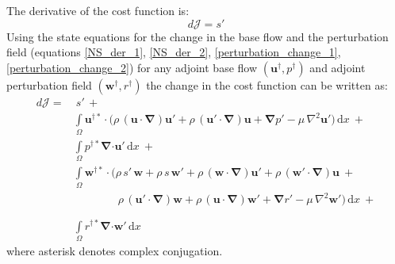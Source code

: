 \documentclass[12pt, a4paper]{article}
\begin{document}
    The derivative of the cost function is:
    \begin{equation}
        d \mathcal{J} = s'
    \end{equation}
    Using the state equations for the change in the base flow and the perturbation field (equations \ref{NS_der_1}, \ref{NS_der_2}, \ref{perturbation_change_1}, \ref{perturbation_change_2}) for any adjoint base flow $(\mathbf{u^{\dagger}},p^{\dagger})$ and adjoint perturbation field $(\mathbf{w^{\dagger}},r^{\dagger})$ the change in the cost function can be written as:
    \begin{equation}
    \begin{split}
        d \mathcal{J} =& \ s' \, + \\
        & \int\limits_{\Omega} \mathbf{u^{\dagger *} \cdot} \bigg( 
            \rho \, (\mathbf{u \cdot} \boldsymbol{\nabla}) \mathbf{u'} + 
            \rho \, (\mathbf{u' \cdot} \boldsymbol{\nabla}) \mathbf{u} + 
            \boldsymbol{\nabla} p' - 
            \mu \, \nabla^2 \mathbf{u'}
        \bigg) \, \mathrm{d} x \ + \\
        & \int\limits_{\Omega} p^{\dagger *} 
            \boldsymbol{\nabla} \mathbf{\cdot u'}
        \, \mathrm{d} x \ + \\
        & \int\limits_{\Omega} \mathbf{w^{\dagger *} \cdot} \bigg( 
            \rho \, s' \, \mathbf{w} + 
            \rho \, s \, \mathbf{w'} + 
            \rho \, (\mathbf{w \cdot} \boldsymbol{\nabla}) \mathbf{u'} + 
            \rho \, (\mathbf{w' \cdot} \boldsymbol{\nabla}) \mathbf{u} \ + \\
        &\phantom{\int\limits_{\Omega} \mathbf{w^{\dagger *} \cdot} \bigg( \ }
            \rho \, (\mathbf{u' \cdot} \boldsymbol{\nabla}) \mathbf{w} + 
            \rho \, (\mathbf{u \cdot} \boldsymbol{\nabla}) \mathbf{w'} +
            \boldsymbol{\nabla} r' - 
            \mu \, \nabla^2 \mathbf{w'}
        \bigg) \, \mathrm{d} x \ + \\
        & \int\limits_{\Omega} r^{\dagger *} 
            \boldsymbol{\nabla} \mathbf{\cdot w'}
        \, \mathrm{d} x
    \end{split}
    \end{equation}
    where asterisk denotes complex conjugation.
    
\end{document}
